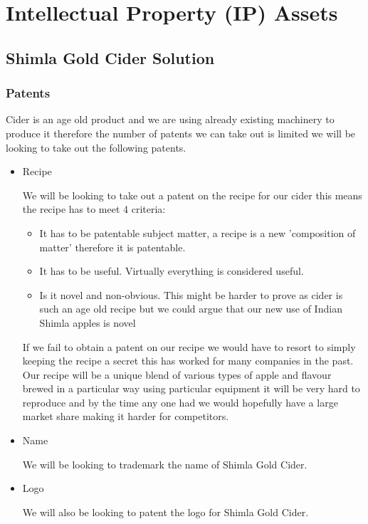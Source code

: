 \documentclass[11pt]{article}
\begin{document}
\newpage


\section{Intellectual Property (IP) Assets}
  \subsection{Shimla Gold Cider Solution}
    \subsubsection{Patents}
Cider is an age old product and we are using already existing machinery to
produce it therefore the number of patents we can take out is limited we will be
looking to take out the following patents.

\begin{itemize}

\item Recipe

We will be looking to take out a patent on the recipe for our cider this means
the recipe has to meet 4 criteria:
 	      \begin{itemize}
		    \item It has to be patentable subject matter, a recipe is a new
'composition of matter' therefore it is patentable.
		    \item It has to be useful. Virtually everything is considered useful.
		    \item Is it novel and non-obvious. This might be harder to prove as
cider is such an age old recipe but we could argue that our new use of Indian
Shimla apples is novel
	      \end{itemize}
If we fail to obtain a patent on our recipe we would have to resort to simply
keeping the recipe a secret this has worked for many companies in the past. Our
recipe will be a unique blend of various types of apple and flavour brewed in a
particular way using particular equipment it will be very hard to reproduce and
by the time any one had we would hopefully have a large market share making it
harder for competitors.

\item Name

We will be looking to trademark the name of Shimla Gold Cider.

\item Logo

We will also be looking to patent the logo for Shimla Gold Cider.
\end{itemize}
\end{document}
